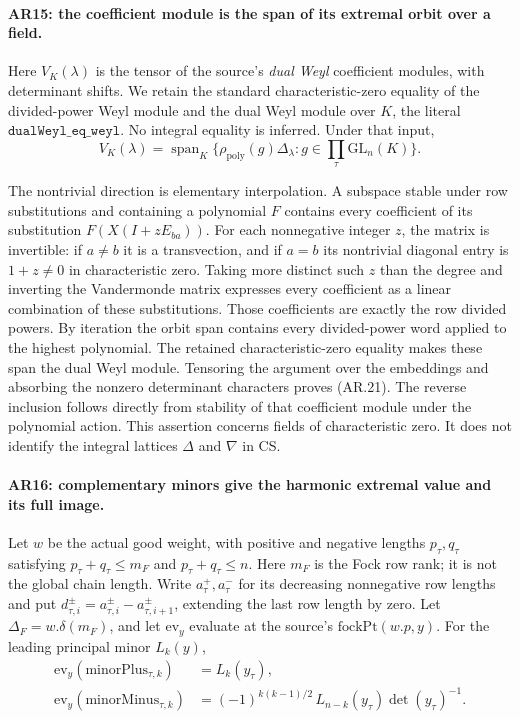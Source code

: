 \paragraph{AR15: the coefficient module is the span of its extremal orbit over a field.}
Here $V_K(\lambda)$ is the tensor of the source's \emph{dual Weyl}
coefficient modules, with determinant shifts. We retain the standard
characteristic-zero equality of the divided-power Weyl module and
the dual Weyl module over $K$, the literal
$\texttt{dualWeyl\_eq\_weyl}$. No integral equality is inferred.
Under that input,
\[
 V_K(\lambda)
   =\operatorname{span}_K
       \{\rho_{\mathrm{poly}}(g)\Delta_\lambda:
                         g\in\prod_\tau\mathrm{GL}_n(K)\}.
                                                               \tag{AR.21}
\]

The nontrivial direction is elementary interpolation. A subspace
stable under row substitutions and containing a polynomial $F$
contains every coefficient of its substitution
$F(X(I+zE_{ba}))$. For each nonnegative integer $z$, the matrix is
invertible: if $a\ne b$ it is a transvection, and if $a=b$ its
nontrivial diagonal entry is $1+z\ne0$ in characteristic zero.
Taking more distinct such $z$ than the degree and inverting the
Vandermonde matrix expresses every coefficient as a linear
combination of these substitutions. Those coefficients are exactly
the row divided powers. By iteration the orbit span contains every
divided-power word applied to the highest polynomial.
The retained characteristic-zero equality makes these span the
dual Weyl module. Tensoring the argument over the embeddings and
absorbing the nonzero determinant characters proves (AR.21).
The reverse inclusion follows directly from stability of that
coefficient module under the polynomial action.
This assertion concerns fields of characteristic zero. It does
not identify the integral lattices $\Delta$ and $\nabla$ in CS.

\paragraph{AR16: complementary minors give the harmonic extremal value and its full image.}
Let $w$ be the actual good weight, with positive and negative
lengths $p_\tau,q_\tau$ satisfying $p_\tau+q_\tau\le m_F$ and
$p_\tau+q_\tau\le n$. Here $m_F$ is the Fock row rank; it is not the
global chain length. Write $a_\tau^+,a_\tau^-$ for its decreasing
nonnegative row lengths and put
$d_{\tau,i}^{\pm}=a_{\tau,i}^{\pm}-a_{\tau,i+1}^{\pm}$, extending
the last row length by zero. Let $\Delta_F=w.\delta(m_F)$, and let
$\mathrm{ev}_y$ evaluate at the source's $\mathrm{fockPt}(w.p,y)$.
For the leading principal minor $L_k(y)$,
\[
 \begin{split}
 \mathrm{ev}_y(\mathrm{minorPlus}_{\tau,k})&=L_k(y_\tau),\\
 \mathrm{ev}_y(\mathrm{minorMinus}_{\tau,k})
    &=(-1)^{k(k-1)/2}\,
                L_{n-k}(y_\tau)\det(y_\tau)^{-1}.
 \end{split}                                                   \tag{AR.22}
\]

